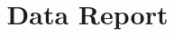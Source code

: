 \documentclass{article}
\begin{document}
        \title{Data Report}
        \maketitle

        
\end{document}
